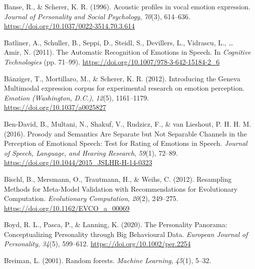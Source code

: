 \documentclass[
  english,
  man,floatsintext]{apa6}
\newlength{\cslhangindent}
\newenvironment{CSLReferences}[2] %
 {%
  \setlength{\parindent}{0pt}
  \ifodd #1 \everypar{\setlength{\hangindent}{\cslhangindent}}\ignorespaces\fi
  \ifnum #2 > 0
  \setlength{\parskip}{#2\baselineskip}
  \fi
 }%
 {}
\begin{document}
\hypertarget{refs}{}
\begin{CSLReferences}{1}{0}
\leavevmode{}%
Banse, R., \& Scherer, K. R. (1996). Acoustic profiles in vocal emotion expression. \emph{Journal of Personality and Social Psychology}, \emph{70}(3), 614--636. \url{https://doi.org/10.1037/0022-3514.70.3.614}

\leavevmode{}%
Batliner, A., Schuller, B., Seppi, D., Steidl, S., Devillers, L., Vidrascu, L., \ldots{} Amir, N. (2011). The {Automatic Recognition} of {Emotions} in {Speech}. In \emph{Cognitive {Technologies}} (pp. 71--99). \url{https://doi.org/10.1007/978-3-642-15184-2_6}

\leavevmode{}%
Bänziger, T., Mortillaro, M., \& Scherer, K. R. (2012). Introducing the {Geneva Multimodal} expression corpus for experimental research on emotion perception. \emph{Emotion (Washington, D.C.)}, \emph{12}(5), 1161--1179. \url{https://doi.org/10.1037/a0025827}

\leavevmode{}%
Ben-David, B., Multani, N., Shakuf, V., Rudzicz, F., \& van Lieshout, P. H. H. M. (2016). Prosody and {Semantics Are Separate} but {Not Separable Channels} in the {Perception} of {Emotional Speech}: {Test} for {Rating} of {Emotions} in {Speech}. \emph{Journal of Speech, Language, and Hearing Research}, \emph{59}(1), 72--89. \url{https://doi.org/10.1044/2015_JSLHR-H-14-0323}

\leavevmode{}%
Bischl, B., Mersmann, O., Trautmann, H., \& Weihs, C. (2012). Resampling {Methods} for {Meta-Model Validation} with {Recommendations} for {Evolutionary Computation}. \emph{Evolutionary Computation}, \emph{20}(2), 249--275. \url{https://doi.org/10.1162/EVCO_a_00069}

\leavevmode{}%
Boyd, R. L., Pasca, P., \& Lanning, K. (2020). The {Personality Panorama}: {Conceptualizing Personality} through {Big Behavioural Data}. \emph{European Journal of Personality}, \emph{34}(5), 599--612. \url{https://doi.org/10.1002/per.2254}

\leavevmode{}%
Breiman, L. (2001). Random forests. \emph{Machine Learning}, \emph{45}(1), 5--32.


\end{CSLReferences}
\end{document}
